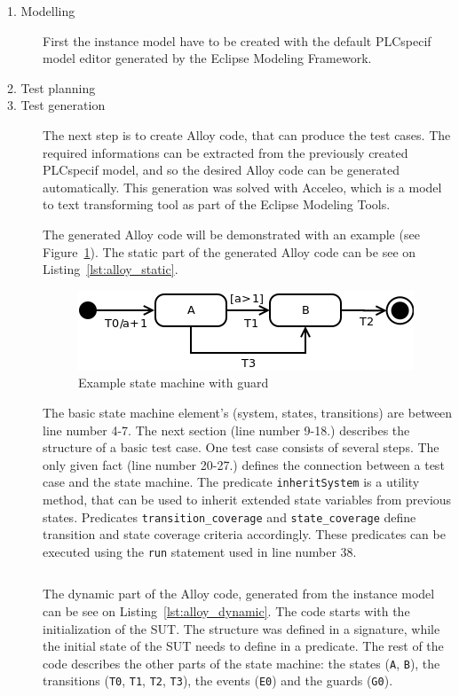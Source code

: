 \begin{description}
	\item[1. Modelling] First the instance model have to be created with the default PLCspecif model editor generated by the Eclipse Modeling Framework.
	\item[2. Test planning]
	\item[3. Test generation] The next step is to create Alloy code, that can produce the test cases. The required informations can be extracted from the previously created PLCspecif model, and so the desired Alloy code can be generated automatically. This generation was solved with Acceleo, which is a model to text transforming tool as part of the Eclipse Modeling Tools.
	
	The generated Alloy code will be demonstrated with an example (see Figure~\ref{fig:alloy_statemachine}). The static part of the generated Alloy code can be see on Listing~\ref{lst:alloy_static}.

\begin{figure}[htp]
\centering
\includegraphics[scale=0.5]{figures/alloy_statemachine}
\caption{Example state machine with guard}
\label{fig:alloy_statemachine}
\end{figure}

The basic state machine element's (system, states, transitions) are between line number 4-7. The next section (line number 9-18.) describes the structure of a basic test case. One test case consists of several steps. The only given fact (line number 20-27.) defines the connection between a test case and the state machine. The predicate \texttt{inheritSystem} is a utility method, that can be used to inherit extended state variables from previous states. Predicates \texttt{transition\_coverage} and \texttt{state\_coverage} define transition and state coverage criteria accordingly. These predicates can be executed using the \texttt{run} statement used in line number 38.

\begin{lstlisting}[label={lst:alloy_static}, caption=Test suite generator Alloy code,breaklines=true]

\end{lstlisting}

The dynamic part of the Alloy code, generated from the instance model can be see on Listing~\ref{lst:alloy_dynamic}. The code starts with the initialization of the SUT. The structure was defined in a signature, while the initial state of the SUT needs to define in a predicate. The rest of the code describes the other parts of the state machine: the states (\texttt{A}, \texttt{B}), the transitions (\texttt{T0}, \texttt{T1}, \texttt{T2}, \texttt{T3}), the events (\texttt{E0}) and the guards (\texttt{G0}).


\end{description}
